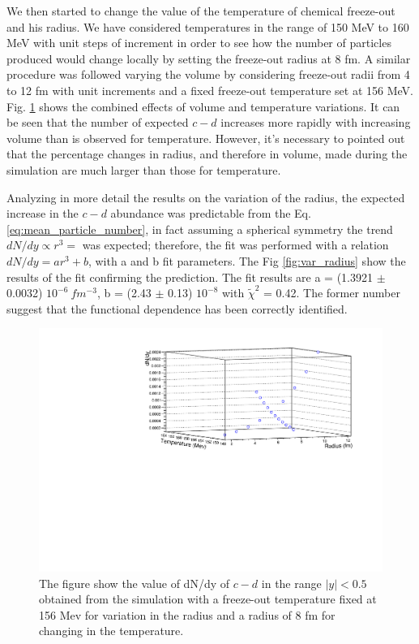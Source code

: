 \documentclass[12pt,a4paper]{book}
\begin{document}
	We then started to change the value of the temperature of chemical freeze-out and his radius. We have considered temperatures in the range of 150 MeV to 160 MeV with unit steps of increment in order to see how the number of particles produced would change locally by setting the freeze-out radius at 8 fm. A similar procedure was followed varying the volume by considering freeze-out radii from 4 to 12 fm with unit increments and a fixed freeze-out temperature set at 156 MeV. Fig. \ref{fig:2dgraph} shows the combined effects of volume and temperature variations. It can be seen that the number of expected $c-d$ increases more rapidly with increasing volume than is observed for temperature. However, it's necessary to pointed out that the percentage changes in radius, and therefore in volume, made during the simulation are much larger than those for temperature.
	
  Analyzing in more detail the results on the variation of the radius, the expected increase in the $c-d$ abundance  was predictable from the Eq. \ref{eq:mean_particle_number}, in fact assuming a spherical symmetry the trend $dN/dy \propto r^3 = $ was expected; therefore, the fit was performed with a relation $dN/dy =a r^3 +b$, with a and b fit parameters. The Fig \ref{fig:var_radius} show the results of the fit confirming the prediction. The fit results are  a = (1.3921 $\pm$ 0.0032) $10^{-6} \ fm^{-3}$, b = (2.43 $\pm$ 0.13) $10^{-8}$ with $\tilde{\chi}^2$ = 0.42. The former number suggest that the functional dependence has been correctly identified.   
	\begin{figure}
		\centering
			\includegraphics[width=0.9 \linewidth]{pictures/2dgraph.pdf}
		\caption{The figure show the value of dN/dy of $c-d$ in the range $|y|<0.5$ obtained from the simulation with a freeze-out temperature fixed at 156 Mev for variation in the radius and a radius of 8 fm for changing in the temperature.}
		\label{fig:2dgraph}
	\end{figure}
	
\end{document}
